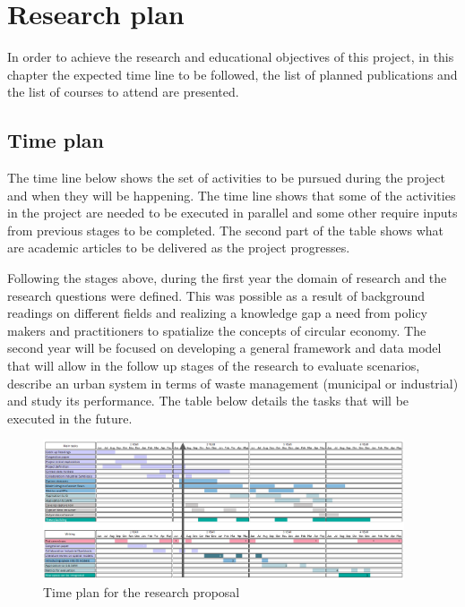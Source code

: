 \chapter{Research plan}
In order to achieve the research and educational objectives of this project, in this chapter the expected time line to be followed, the list of planned publications and the list of courses to attend are presented. 



\section{Time plan}
The time line below shows the set of activities to be pursued during the project and when they will be happening. The time line shows that some of the activities in the project are needed to be executed in parallel and some other require inputs from previous stages to be completed. The second part of the table shows what are academic articles to be delivered as the project progresses. \par
Following the stages above, during the first year the domain of research and the research questions were defined. This was possible as a result of background readings on different fields and realizing a knowledge gap a need from policy makers and practitioners to spatialize the concepts of circular economy. The second year will be focused on developing a general framework and data model that will allow in the follow up stages of the research to evaluate scenarios, describe an urban system in terms of waste management (municipal or industrial) and study its performance. 
The table below details the tasks that will be executed in the future. \par

\begin{figure}[h!]
    \centering
    \includegraphics[width=0.95\textwidth]{sections/asset/timeplan.PNG}
    \caption{Time plan for the research proposal}
    \label{fig:research_time}
\end{figure}


